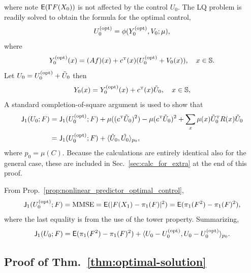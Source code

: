 \documentclass[twoside,11pt]{article}
\def\Sec#1{Sec.~\ref{#1}}
\def\Sec#1{Sec.~\ref{#1}}
\def\Sec#1{Sec~\ref{#1}}
\def\E{{\sf E}}
\def\Sec#1{Sec.~\ref{#1}}
\def\bS{\begin{slide}}
\def\E{{\sf E}}
\def\Sec#1{Sec.~\ref{#1}}
\def\Thm#1{Thm.~\ref{#1}}
\def\Prop#1{Prop.~\ref{#1}}
\def\E{{\sf E}}
\def\bS{\mathbb{S}}
\def\sJ{{\sf J}}
\def\tp{{\hbox{\rm\tiny T}}}
\def\opt{{\text{\rm (opt)}}}
\begin{document}
where note $\E (\Gamma F(X_0))$ is not affected by the control
$U_0$. The LQ problem is readily solved to obtain the formula for the optimal
control,
\begin{equation*}
U_0^\opt = \phi(Y_0^\opt,V_0;\mu),
\end{equation*}
where
\begin{equation*}
Y_0^\opt(x) = (Af)(x) + c^\tp(x) (U_0^\opt + V_0(x)),\quad x\in\bS.
\end{equation*}
Let $U_0 = U_0^\opt + \tilde{U}_0$ then
\begin{equation*}
Y_0(x) = Y_0^\opt(x) + c^\tp(x) \tilde{U}_0 ,\quad x\in\bS,
\end{equation*}
A standard completion-of-square argument is used to show that
\begin{align*}
 \sJ_1(U_0;F) &=  \sJ_1(U_0^\opt;F) +  \mu((c^\tp \tilde{U}_0)^2) - \mu(c^\tp \tilde{U}_0)^2 + 
                                         \sum_{x} \mu(x) \tilde{U}_0^\tp
                R(x) \tilde{U}_0 \nonumber \\
  &=\sJ_1(U_0^\opt;F) + \langle \tilde{U}_0,\tilde{U_0}\rangle_{p_0},\label{eq:last_step_formula}
\end{align*}
where $p_0=\mu (C)$.  Because the calculations are entirely identical
also for the general case, these are included in
\Sec{sec:calc_for_extra} at the end of this proof. 


From 
\Prop{prop:nonlinear_predictor_optimal_control}, 
\begin{equation*}
\sJ_1(U_0^\opt;F) = \text{MMSE} = \E( |F(X_1)- \pi_1(F)|^2) = \E (\pi_1(F^2)- \pi_1(F)^2),
\end{equation*}
where the last equality is from the use of the tower property.
Summarizing, 
\begin{equation}\label{eq:base_case}
\sJ_1(U_0;F) = \E (\pi_1(F^2)- \pi_1(F)^2) + \langle U_0-U_0^\opt, U_0-U_0^\opt \rangle_{p_0}.
\end{equation}

\subsection{Proof of \Thm{thm:optimal-solution}}
\end{document}
